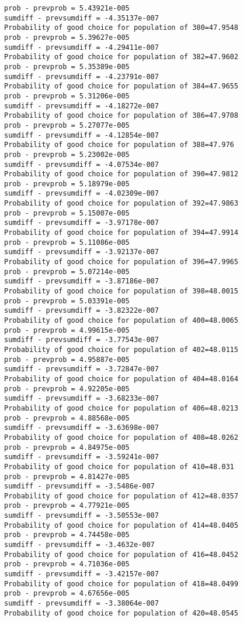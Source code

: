 \documentclass[11pt,onecolumn]{article}
\begin{document}
\begin{verbatim}
prob - prevprob = 5.43921e-005
sumdiff - prevsumdiff = -4.35137e-007
Probability of good choice for population of 380=47.9548
prob - prevprob = 5.39627e-005
sumdiff - prevsumdiff = -4.29411e-007
Probability of good choice for population of 382=47.9602
prob - prevprob = 5.35389e-005
sumdiff - prevsumdiff = -4.23791e-007
Probability of good choice for population of 384=47.9655
prob - prevprob = 5.31206e-005
sumdiff - prevsumdiff = -4.18272e-007
Probability of good choice for population of 386=47.9708
prob - prevprob = 5.27077e-005
sumdiff - prevsumdiff = -4.12854e-007
Probability of good choice for population of 388=47.976
prob - prevprob = 5.23002e-005
sumdiff - prevsumdiff = -4.07534e-007
Probability of good choice for population of 390=47.9812
prob - prevprob = 5.18979e-005
sumdiff - prevsumdiff = -4.02309e-007
Probability of good choice for population of 392=47.9863
prob - prevprob = 5.15007e-005
sumdiff - prevsumdiff = -3.97178e-007
Probability of good choice for population of 394=47.9914
prob - prevprob = 5.11086e-005
sumdiff - prevsumdiff = -3.92137e-007
Probability of good choice for population of 396=47.9965
prob - prevprob = 5.07214e-005
sumdiff - prevsumdiff = -3.87186e-007
Probability of good choice for population of 398=48.0015
prob - prevprob = 5.03391e-005
sumdiff - prevsumdiff = -3.82322e-007
Probability of good choice for population of 400=48.0065
prob - prevprob = 4.99615e-005
sumdiff - prevsumdiff = -3.77543e-007
Probability of good choice for population of 402=48.0115
prob - prevprob = 4.95887e-005
sumdiff - prevsumdiff = -3.72847e-007
Probability of good choice for population of 404=48.0164
prob - prevprob = 4.92205e-005
sumdiff - prevsumdiff = -3.68233e-007
Probability of good choice for population of 406=48.0213
prob - prevprob = 4.88568e-005
sumdiff - prevsumdiff = -3.63698e-007
Probability of good choice for population of 408=48.0262
prob - prevprob = 4.84975e-005
sumdiff - prevsumdiff = -3.59241e-007
Probability of good choice for population of 410=48.031
prob - prevprob = 4.81427e-005
sumdiff - prevsumdiff = -3.5486e-007
Probability of good choice for population of 412=48.0357
prob - prevprob = 4.77921e-005
sumdiff - prevsumdiff = -3.50553e-007
Probability of good choice for population of 414=48.0405
prob - prevprob = 4.74458e-005
sumdiff - prevsumdiff = -3.4632e-007
Probability of good choice for population of 416=48.0452
prob - prevprob = 4.71036e-005
sumdiff - prevsumdiff = -3.42157e-007
Probability of good choice for population of 418=48.0499
prob - prevprob = 4.67656e-005
sumdiff - prevsumdiff = -3.38064e-007
Probability of good choice for population of 420=48.0545

\end{verbatim}
\end{document}
